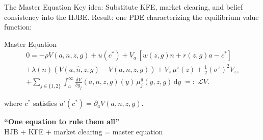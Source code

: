 \documentclass[aspectratio=169,11pt]{beamer}
\newcommand{\emphc}[1]{\textcolor{harvardcrimson}{#1}}
\newcommand{\ud}{\,\mathrm{d}}
\newcommand{\ubar}[1]{\underline{#1}}
\begin{document}
\begin{frame}{The Master Equation}
\footnotesize
\emphc{Key idea}: Substitute KFE, market clearing, and belief consistency \emphc{into} the HJBE.
Result: \emphc{one PDE} characterizing the equilibrium value function:

\vspace{0.1em}
\begin{block}{Master Equation}
\footnotesize
\vspace{-0.2em}
\begin{multline*}
0 = -\rho V(a,n,z,g) + u(c^*) + V_a\,[w(z,g)n+r(z,g)a-c^*] \\
+ \lambda(n)\!\left(V(a,\hat n,z,g)-V(a,n,z,g)\right)
+ V_z\,\mu^z(z) + \tfrac12(\sigma^z)^2V_{zz} \\
+ \sum_{j\in\{1,2\}}\int_{\ubar a}^{\infty}
\frac{\delta V}{\delta g_j}(a,n,z,g)(y)\,\mu^g_j(y,z,g)\ud y
\;=:\;\mathcal{L}V.
\end{multline*}
\vspace{-0.2em}
\end{block}

where $c^*$ satisfies $u'(c^*) = \partial_a V(a,n,z,g)$.

\vspace{0.2em}
\begin{center}
\colorbox{uzhgreylight}{\parbox{0.6\textwidth}{\centering\small
\textbf{``One equation to rule them all''}\\
HJB + KFE + market clearing = master equation}}
\end{center}
\end{frame}
\end{document}
